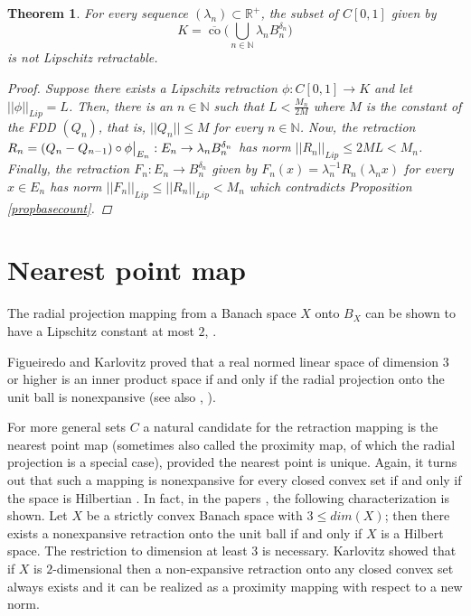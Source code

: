 \documentclass[11pt]{amsart}
\newcommand{\N}{\mathbb{N}}
\newcommand{\R}{\mathbb{R}}
\newcommand\restr[2]{{%
  \left.\kern-\nulldelimiterspace %
  #1 %
  \vphantom{\big|} %
  \right|_{#2} %
  }}
\DeclareMathOperator{\co}{co}
\newcommand{\<}{\langle}
\renewcommand{\>}{\rangle}
\newtheorem{theorem}{Theorem}[section]
\theoremstyle{definition}
\theoremstyle{remark}
\numberwithin{equation}{section}
\def\R{{\mathbb R}}
\begin{document}
\begin{theorem}\label{counterex}
For every sequence $(\lambda_n)\subset \R^+$, the subset of $C[0,1]$ given by
$$K=\overline{\co}\bigg(\bigcup\limits_{n\in\N}\lambda_nB_n^{\delta_n}\bigg)$$
is not Lipschitz retractable.
\begin{proof}
Suppose there exists a Lipschitz retraction $\phi:C[0,1]\rightarrow K$ and let $||\phi||_{Lip}=L$. Then, there is an $n\in\N$ such that $L<\frac{M_n}{2M}$ where $M$ is the constant of the FDD $(Q_n)$, that is, $||Q_n||\le M$ for every $n\in\N$. Now, the retraction $R_n=(Q_n-Q_{n-1})\circ\restr{\phi}{E_n}:E_n\rightarrow \lambda_nB_n^{\delta_n}$ has norm $||R_n||_{Lip}\le2ML<M_n$. Finally, the retraction $F_n:E_n\rightarrow B_n^{\delta_n}$ given by $F_n(x)=\lambda_n^{-1}R_n(\lambda_nx)$ for every $x\in E_n$ has norm $||F_n||_{Lip}\le||R_n||_{Lip}<M_n$ which contradicts Proposition \ref{propbasecount}.
\end{proof}
\end{theorem}




\section{Nearest point map}


 The radial projection mapping from a Banach space $X$  onto $B_X$ can be shown to have a Lipschitz constant at most $2$, \cite{DW64}.

 Figueiredo and Karlovitz \cite{FK67} proved that a real normed linear space of dimension $3$ or higher is an inner product space
 if and only if the radial projection onto the unit ball is nonexpansive (see also  \cite{Phe58}, \cite{Sch65}).

For more general sets $C$ a natural candidate for the retraction mapping is the nearest point map (sometimes also called the proximity map,
of which the radial projection is a special case), provided the nearest point is unique. Again, it turns out that
such a mapping is nonexpansive for every closed convex set if and only if the space is Hilbertian \cite{Phe58}. In fact,
in the papers  \cite{BR74}
\cite{FK70}, the following characterization is shown.
 Let $X$ be a strictly convex Banach space with $3\le dim(X)$; then there exists a nonexpansive retraction onto the unit ball if and only if $X$ is a Hilbert space. 
The restriction to dimension at least $3$ is necessary.
Karlovitz \cite{Kar72} showed that if $X$ is $2$-dimensional then a non-expansive retraction onto any closed convex set always exists and it can be realized
 as a proximity mapping with respect to a new norm.
\end{document}
